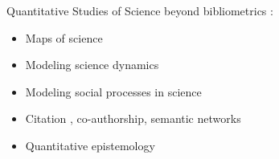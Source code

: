 {Quantitative Studies of Science beyond bibliometrics \cite{cronin2014beyond}:

\medskip

\begin{itemize}
	\item Maps of science \cite{borner2012design}\cite{leydesdorff2009global}
	\item Modeling science dynamics \cite{borner2011modeling}
	\item Modeling social processes in science \cite{edmonds2011simulating}
	\item Citation \cite{shibata2008detecting}, co-authorship, semantic networks \cite{gaumont2017methods}
	\item Quantitative epistemology \cite{chavalarias2013phylomemetic}
\end{itemize}


}


